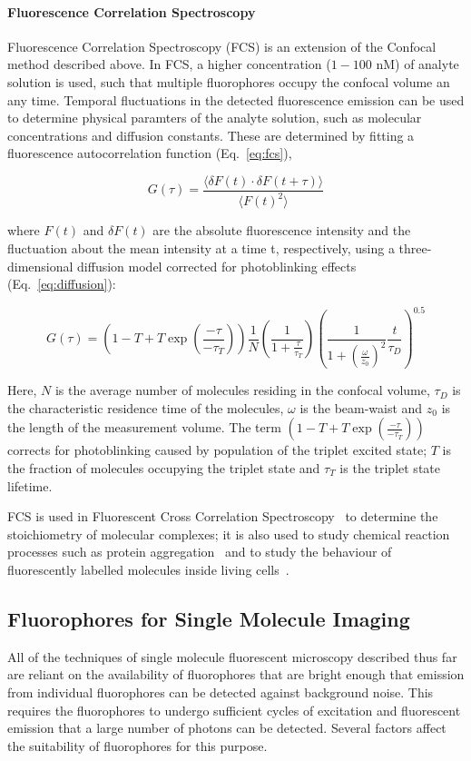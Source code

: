 \paragraph{Fluorescence Correlation Spectroscopy}
Fluorescence Correlation Spectroscopy (FCS) is an extension of the Confocal method described above. In FCS, a higher concentration ($1 - 100$ nM) of analyte solution is used, such that multiple fluorophores occupy the confocal volume an any time. Temporal fluctuations in the detected fluorescence emission can be used to determine physical paramters of the analyte solution, such as molecular concentrations and diffusion constants. These are determined by fitting a fluorescence autocorrelation function (Eq.~\ref{eq:fcs}), 

\begin{equation}
G(\tau) = \frac{\langle \delta F(t) \cdot \delta F(t + \tau)\rangle}{\langle F(t)^2 \rangle}
\label{eq:fcs}
\end{equation}   

where  $F(t)$ and $\delta F(t)$ are the absolute fluorescence intensity and the fluctuation about the mean intensity at a time t, respectively, using a three-dimensional diffusion model corrected for photoblinking effects (Eq.~\ref{eq:diffusion}): 

\begin{equation}
G(\tau) = \left( 1 - T + T\exp(\frac{-\tau}{-\tau_T}) \right)\frac{1}{N}\left( \frac{1}{1 + \frac{\tau}{\tau_T}} \right)\left( \frac{1}{1 + (\frac{\omega}{z_0})^2}\frac{t}{\tau_D}\right)^{0.5}
\label{eq:diffusion}
\end{equation}   

Here, $N$ is the average number of molecules residing in the confocal volume, $\tau_D$ is the characteristic residence time of the molecules, $\omega$ is the beam-waist and $z_0$ is the length of the measurement volume. The term $\left( 1 - T + T\exp(\frac{-\tau}{-\tau_T}) \right)$ corrects for photoblinking caused by population of the triplet excited state; $T$ is the fraction of molecules occupying the triplet state and $\tau_T$ is the triplet state lifetime.

FCS is used in Fluorescent Cross Correlation Spectroscopy~\cite{???} to determine the stoichiometry of molecular complexes; it is also used to study chemical reaction processes such as protein aggregation~\cite{???} and to study the behaviour of fluorescently labelled molecules inside living cells~\cite{???}. 

\subsection{Fluorophores for Single Molecule Imaging}
\label{sect:fluorophores}
All of the techniques of single molecule fluorescent microscopy described thus far are reliant on the availability of fluorophores that are bright enough that emission from individual fluorophores can be detected against background noise.  This requires the fluorophores to undergo sufficient cycles of excitation and fluorescent emission that a large number of photons can be detected. Several factors affect the suitability of fluorophores for this purpose.

